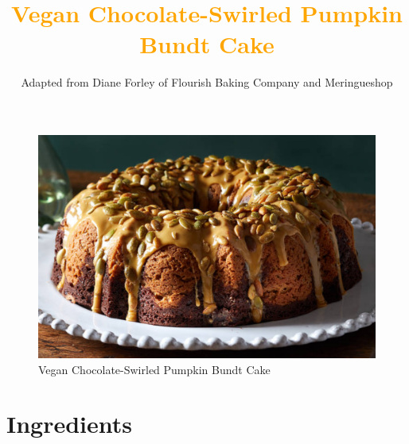 \documentclass[12pt]{article}
\begin{document}
\title{\textcolor{orange}{\Huge Vegan Chocolate-Swirled Pumpkin Bundt Cake}}
\author{Adapted from Diane Forley of Flourish Baking Company and Meringueshop}
\date{}

\maketitle

\begin{multicols}{2}

\begin{figure}[H]
\centering
\includegraphics[width=\columnwidth]{bundt.png}
\caption{Vegan Chocolate-Swirled Pumpkin Bundt Cake}
\end{figure}

\section{Ingredients}


\end{multicols}
\end{document}
